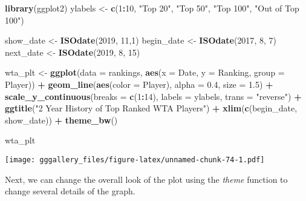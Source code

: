 \documentclass[]{book}
\newenvironment{Shaded}{\begin{snugshade}}{\end{snugshade}}
\newcommand{\DataTypeTok}[1]{\textcolor[rgb]{0.13,0.29,0.53}{#1}}
\newcommand{\DecValTok}[1]{\textcolor[rgb]{0.00,0.00,0.81}{#1}}
\newcommand{\FloatTok}[1]{\textcolor[rgb]{0.00,0.00,0.81}{#1}}
\newcommand{\KeywordTok}[1]{\textcolor[rgb]{0.13,0.29,0.53}{\textbf{#1}}}
\newcommand{\NormalTok}[1]{#1}
\newcommand{\OperatorTok}[1]{\textcolor[rgb]{0.81,0.36,0.00}{\textbf{#1}}}
\newcommand{\StringTok}[1]{\textcolor[rgb]{0.31,0.60,0.02}{#1}}
\begin{document}
\begin{Shaded}
\begin{Highlighting}[]
\KeywordTok{library}\NormalTok{(ggplot2)}
\NormalTok{ylabels <-}\StringTok{ }\KeywordTok{c}\NormalTok{(}\DecValTok{1}\OperatorTok{:}\DecValTok{10}\NormalTok{, }\StringTok{"Top 20"}\NormalTok{, }\StringTok{"Top 50"}\NormalTok{, }\StringTok{"Top 100"}\NormalTok{, }\StringTok{"Out of Top 100"}\NormalTok{)}


\NormalTok{show_date <-}\StringTok{ }\KeywordTok{ISOdate}\NormalTok{(}\DecValTok{2019}\NormalTok{, }\DecValTok{11}\NormalTok{,}\DecValTok{1}\NormalTok{)}
\NormalTok{begin_date <-}\StringTok{ }\KeywordTok{ISOdate}\NormalTok{(}\DecValTok{2017}\NormalTok{, }\DecValTok{8}\NormalTok{, }\DecValTok{7}\NormalTok{)}
\NormalTok{next_date <-}\StringTok{ }\KeywordTok{ISOdate}\NormalTok{(}\DecValTok{2019}\NormalTok{, }\DecValTok{8}\NormalTok{, }\DecValTok{15}\NormalTok{)}



\NormalTok{wta_plt <-}\StringTok{ }\KeywordTok{ggplot}\NormalTok{(}\DataTypeTok{data =}\NormalTok{ rankings, }\KeywordTok{aes}\NormalTok{(}\DataTypeTok{x =}\NormalTok{ Date, }\DataTypeTok{y =}\NormalTok{ Ranking, }\DataTypeTok{group =}\NormalTok{ Player)) }\OperatorTok{+}\StringTok{ }
\StringTok{  }\KeywordTok{geom_line}\NormalTok{(}\KeywordTok{aes}\NormalTok{(}\DataTypeTok{color =}\NormalTok{ Player), }\DataTypeTok{alpha =} \FloatTok{0.4}\NormalTok{, }\DataTypeTok{size =} \FloatTok{1.5}\NormalTok{) }\OperatorTok{+}
\StringTok{  }\KeywordTok{scale_y_continuous}\NormalTok{(}\DataTypeTok{breaks =} \KeywordTok{c}\NormalTok{(}\DecValTok{1}\OperatorTok{:}\DecValTok{14}\NormalTok{), }\DataTypeTok{labels =}\NormalTok{ ylabels, }\DataTypeTok{trans =} \StringTok{"reverse"}\NormalTok{) }\OperatorTok{+}\StringTok{ }
\StringTok{  }\KeywordTok{ggtitle}\NormalTok{(}\StringTok{"2 Year History of Top Ranked WTA Players"}\NormalTok{) }\OperatorTok{+}\StringTok{ }
\StringTok{  }\KeywordTok{xlim}\NormalTok{(}\KeywordTok{c}\NormalTok{(begin_date, show_date)) }\OperatorTok{+}
\StringTok{  }\KeywordTok{theme_bw}\NormalTok{() }

\NormalTok{wta_plt}
\end{Highlighting}
\end{Shaded}

\texttt{[image: gggallery\_files/figure-latex/unnamed-chunk-74-1.pdf]}

Next, we can change the overall look of the plot using the \emph{theme} function to change several
details of the graph.
\end{document}
